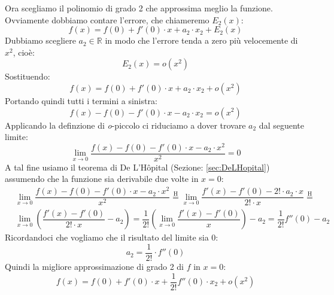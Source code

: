 Ora scegliamo il polinomio di grado 2 che approssima meglio la funzione. Ovviamente dobbiamo contare l'errore, che chiameremo $E_2(x)$:
\begin{equation*}
	f(x) = f(0) + f'(0) \cdot x + a_2 \cdot x_2 + E_2(x)
\end{equation*}
Dubbiamo scegliere $a_2 \in \mathbb{R}$ in modo che l'errore tenda a zero più velocemente di $x^2$, cioè:
\begin{equation*}
	E_2(x) = o(x^2)
\end{equation*}
Sostituendo:
\begin{equation*}
	f(x) = f(0) + f'(0) \cdot x + a_2 \cdot x_2 + o(x^2)
\end{equation*}
Portando quindi tutti i termini a sinistra:
\begin{equation*}
	f(x) - f(0) - f'(0) \cdot x - a_2 \cdot x_2 = o(x^2)
\end{equation*}
Applicando la definzione di \textit{o}-piccolo ci riduciamo a dover trovare $a_2$ dal seguente limite:
\begin{equation*}
	\lim_{x \to 0} \dfrac{f(x) - f(0) - f'(0) \cdot x - a_2 \cdot x^2}{x^2} = 0
\end{equation*}
A tal fine usiamo il teorema di De L'Hôpital (Sezione: \ref{sec:DeLHopital}) assumendo che la funzione sia derivabile due volte in $x = 0$:
\begin{align*}
	&\lim_{x \to 0} \dfrac{f(x) - f(0) - f'(0) \cdot x - a_2 \cdot x^2}{x^2} \stackrel{\text{H}}{=} \lim_{x \to 0} \dfrac{f'(x) - f'(0) - 2! \cdot a_2 \cdot x}{2! \cdot x} \stackrel{\text{H}}{=}\\[10pt]
	&\lim_{x \to 0} \left(\dfrac{f'(x) - f'(0)}{2! \cdot x} - a_2\right) = \dfrac{1}{2!} \left(\lim_{x \to 0} \dfrac{f'(x) - f'(0)}{x} \right) - a_2 =  \dfrac{1}{2!} f''(0) - a_2
\end{align*}
Ricordandoci che vogliamo che il risultato del limite sia 0:
\begin{equation*}
	a_2 = \dfrac{1}{2!} \cdot f''(0)
\end{equation*}
Quindi la migliore approssimazione di grado 2 di $f$ in $x = 0$:
\begin{equation*}
	f(x) = f(0) + f'(0) \cdot x + \dfrac{1}{2!} f''(0) \cdot x_2 + o(x^2)
\end{equation*}



